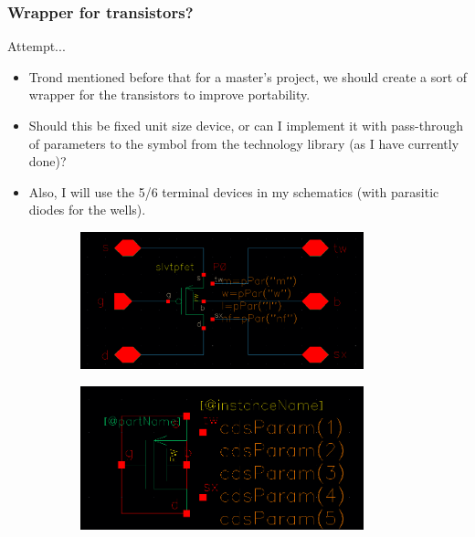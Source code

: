 \documentclass[t, screen, aspectratio=43]{beamer}
\begin{document}
\begin{frame}
	\frametitle{Wrapper for transistors?}
	\begin{block}{Attempt...}
	\tiny
	\begin{itemize}[itemsep=4pt,label=\protect---]
		\item Trond mentioned before that for a master's project, we should create a sort of wrapper for the transistors to improve portability.
		\item Should this be fixed unit size device, or can I implement it with pass-through of parameters to the symbol from the technology library (as I have currently done)?
		\item Also, I will use the 5/6 terminal devices in my schematics (with parasitic diodes for the wells).
	\end{itemize}

	\begin{figure}[htb!]
	    \centering
	    \begin{subfigure}{0.5\textwidth}
	        \centering
	        \center\includegraphics[width=0.9\textwidth, angle=0]{cmos_wrap_schem.png}
	    \end{subfigure}%
	    \begin{subfigure}{0.5\textwidth}
	        \centering
	        \center\includegraphics[width=0.9\textwidth, angle=0]{cmos_wrapper_sym.png}
	    \end{subfigure}
	\end{figure}
	\end{block}	
\end{frame}
\end{document}
